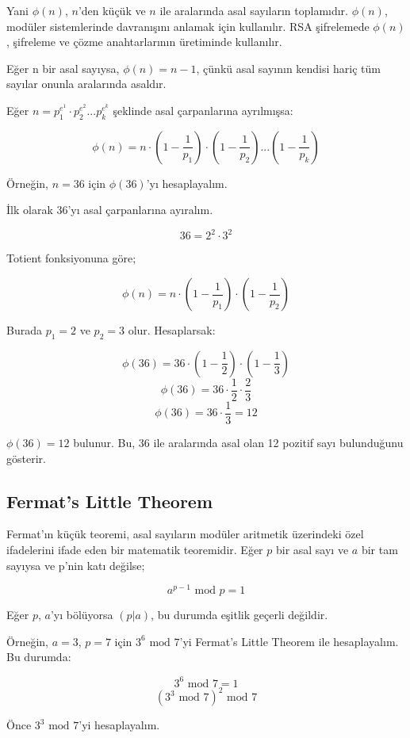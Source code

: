 Yani $\phi(n)$, $n$'den küçük ve $n$ ile aralarında asal sayıların toplamıdır. $\phi(n)$, modüler sistemlerinde davranışını anlamak için kullanılır. RSA şifrelemede $\phi(n)$, şifreleme ve çözme anahtarlarının üretiminde kullanılır.

Eğer n bir asal sayıysa, $\phi(n) = n - 1$, çünkü asal sayının kendisi hariç tüm sayılar onunla aralarında asaldır.

Eğer $n = p_{1}^{e^1} \cdot p_{2}^{e^2} ... p_{k}^{e^k}$ şeklinde asal çarpanlarına ayrılmışsa:

\[ \phi(n) = n \cdot (1 - \frac{1}{p_1}) \cdot (1 - \frac{1}{p_2}) ... (1 - \frac{1}{p_k}) \]

Örneğin, $n = 36$ için $\phi(36)$'yı hesaplayalım.

İlk olarak 36'yı asal çarpanlarına ayıralım.

\[ 36 = 2^2 \cdot 3^2 \]

Totient fonksiyonuna göre;

\[ \phi(n) = n \cdot (1 - \frac{1}{p_1}) \cdot (1 - \frac{1}{p_2}) \]

Burada $p_1 = 2$ ve $p_2 = 3$ olur. Hesaplarsak:

\[ \phi(36) = 36 \cdot (1 - \frac{1}{2}) \cdot (1 - \frac{1}{3}) \]
\[ \phi(36) = 36 \cdot \frac{1}{2} \cdot \frac{2}{3} \]
\[ \phi(36) = 36 \cdot \frac{1}{3} = 12 \]

$\phi(36) = 12$ bulunur. Bu, 36 ile aralarında asal olan 12 pozitif sayı bulunduğunu gösterir.

\newpage

\subsection{Fermat's Little Theorem}

Fermat'ın küçük teoremi, asal sayıların modüler aritmetik üzerindeki özel ifadelerini ifade eden bir matematik teoremidir. Eğer $p$ bir asal sayı ve $a$ bir tam sayıysa ve p'nin katı değilse;

\[ a^{p-1} \text{ mod } p = 1 \]

Eğer $p$, $a$'yı bölüyorsa $(p | a)$, bu durumda eşitlik geçerli değildir.

Örneğin, $a = 3$, $p = 7$ için $3^6 \text{ mod } 7$'yi Fermat's Little Theorem ile hesaplayalım. Bu durumda:

\[ 3^6 \text{ mod } 7 = 1 \]
\[ (3^3 \text{ mod } 7)^2 \text{ mod } 7 \]

Önce $3^3 \text{ mod } 7$'yi hesaplayalım.

